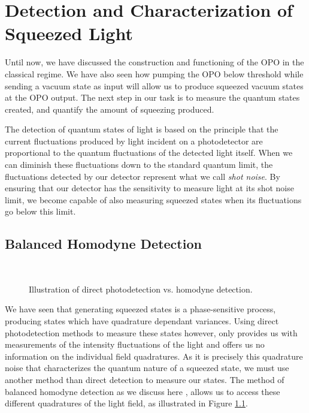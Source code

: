 \chapter{Detection and Characterization of Squeezed Light}
\label{ch:5} 
\minitoc

Until now, we have discussed the construction and functioning of the OPO in the classical regime.  We have also seen how pumping the OPO below threshold while sending a vacuum state as input will allow us to produce squeezed vacuum states at the OPO output.  The next step in our task is to measure the quantum states created, and quantify the amount of squeezing produced. 

The detection of quantum states of light is based on the principle that the
current fluctuations produced by light incident on a photodetector are proportional to the quantum fluctuations of the detected light itself.  When we can diminish these fluctuations down to the standard quantum limit, the fluctuations detected by our detector represent what we call \emph{shot noise}.  By ensuring that our detector has the sensitivity to measure light at its shot noise limit, we become capable of also measuring squeezed states when its fluctuations go below this limit.

\section{Balanced Homodyne Detection}
\label{balanced_homodyne_detection} 


\begin{figure}[!htb]
  \centering
  \hspace{30pt} 
   \\
   \caption[Fresnel representation of direct and homodyne detection]{Illustration of direct photodetection vs. homodyne detection. }
   \label{fig:fresnel_detect}
\end{figure}


We have seen that generating squeezed states is a phase-sensitive process, producing states which have quadrature dependant variances.  Using direct photodetection  methods to measure these states however, only provides us with measurements of the intensity fluctuations of the light and offers us no information on the individual field quadratures.  As it is precisely this quadrature noise that characterizes the quantum nature of a squeezed state, we must use another method than direct detection to measure our states.  The method of balanced homodyne detection as we discuss here \cite{bachor2004guide}, allows us to access these different quadratures of the light field, as illustrated in Figure \ref{fig:fresnel_detect}.


